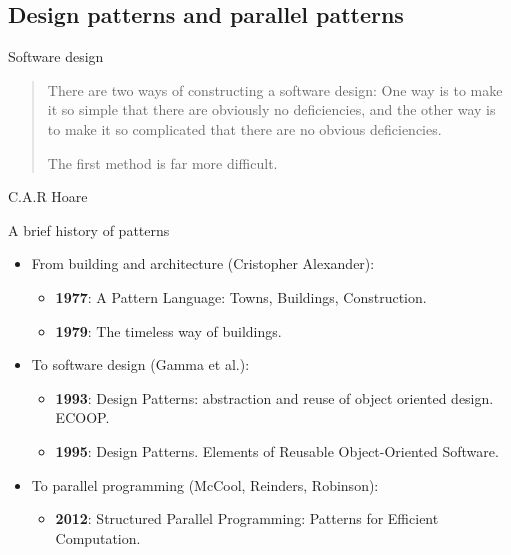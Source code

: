 \subsection{Design patterns and parallel patterns}

\begin{frame}[t]{Software design}

\begin{quote}
There are two ways of constructing a software design: One way is to make it so
simple that there are obviously no deficiencies, and the other way is to make
it so complicated that there are no obvious deficiencies. 

The first method is far more difficult. 
\end{quote}
\hfill C.A.R Hoare
\end{frame}

\begin{frame}[t]{A brief history of patterns}
\begin{itemize}
\item From building and architecture (Cristopher Alexander):
\begin{itemize}
  \item \textbf{1977}: A Pattern Language: Towns, Buildings, Construction.
  \item \textbf{1979}: The timeless way of buildings.
\end{itemize}
\vfill\pause
\item To software design (Gamma et al.):
\begin{itemize}
  \item \textbf{1993}: Design Patterns: abstraction and reuse of object oriented design. ECOOP.
  \item \textbf{1995}: Design Patterns. Elements of Reusable Object-Oriented Software.
\end{itemize}
\vfill\pause
\item To parallel programming (McCool, Reinders, Robinson):
\begin{itemize}
  \item \textbf{2012}: Structured Parallel Programming: Patterns for Efficient Computation.
\end{itemize}
\end{itemize}
\end{frame}

